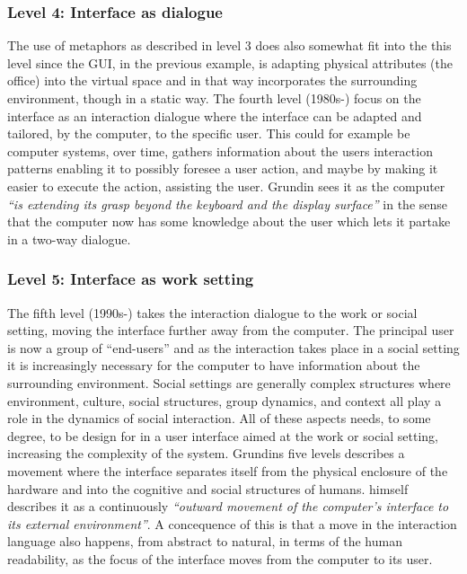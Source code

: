 \subsubsection{Level 4: Interface as dialogue}
The use of metaphors as described in level 3 does also somewhat fit into the this level since the GUI, in the previous example, is adapting physical attributes (the office) into the virtual space and in that way incorporates the surrounding environment, though in a static way.
The fourth level (1980s-) focus on the interface as an interaction dialogue where the interface can be adapted and tailored, by the computer, to the specific user.
This could for example be computer systems, over time, gathers information about the users interaction patterns enabling it to possibly foresee a user action, and maybe by making it easier to execute the action, assisting the user.
Grundin sees it as the computer \emph{``is extending its grasp beyond the keyboard and the display surface''} in the sense that the computer now has some knowledge about the user which lets it partake in a two-way dialogue.

\subsubsection{Level 5: Interface as work setting}
The fifth level (1990s-) takes the interaction dialogue to the work or social setting, moving the interface further away from the computer.
The principal user is now a group of ``end-users'' and as the interaction takes place in a social setting it is increasingly necessary for the computer to have information about the surrounding environment.
Social settings are generally complex structures where environment, culture, social structures, group dynamics, and context all play a role in the dynamics of social interaction.
All of these aspects needs, to some degree, to be design for in a user interface aimed at the work or social setting, increasing the complexity of the system.
\blank
Grundins five levels describes a movement where the interface separates itself from the physical enclosure of the hardware and into the cognitive and social structures of humans.
\citeauthor{grudin1990computer} himself describes it as a continuously \emph{``outward movement of the computer's interface to its external environment''}.
A concequence of this is that a move in the interaction language also happens, from abstract to natural, in terms of the human readability, as the focus of the interface moves from the computer to its user.

